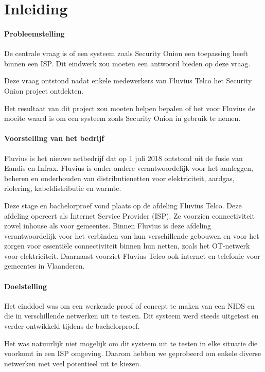 \documentclass[a4paper,12pt]{report}
\begin{document}
\listoffigures

\chapter*{Inleiding}
\subsubsection{Probleemstelling}
De centrale vraag is of een systeem zoals Security Onion een toepassing heeft binnen een ISP.
Dit eindwerk zou moeten een antwoord bieden op deze vraag.

Deze vraag ontstond nadat enkele medewerkers van Fluvius Telco het Security Onion project ontdekten.

Het resultaat van dit project zou moeten helpen bepalen of het voor Fluvius de moeite waard is om een systeem zoals Security Onion in gebruik te nemen.

\subsubsection{Voorstelling van het bedrijf}
Fluvius is het nieuwe netbedrijf dat op 1 juli 2018 ontstond uit de fusie van Eandis en Infrax.
Fluvius is onder andere verantwoordelijk voor het aanleggen, beheren en onderhouden van distributienetten voor elektriciteit, aardgas, riolering, kabeldistributie en warmte.

Deze stage en bachelorproef vond plaats op de afdeling Fluvius Telco.
Deze afdeling opereert als Internet Service Provider (ISP).
Ze voorzien connectiviteit zowel inhouse als voor gemeentes.
Binnen Fluvius is deze afdeling verantwoordelijk voor het verbinden van hun verschillende gebouwen en voor het zorgen voor essentiële connectiviteit binnen hun netten, zoals het OT-netwerk voor elektriciteit.
Daarnaast voorziet Fluvius Telco ook internet en telefonie voor gemeentes in Vlaanderen.

\subsubsection{Doelstelling}
Het einddoel was om een werkende proof of concept te maken van een NIDS en die in verschillende netwerken uit te testen.
Dit systeem werd steeds uitgetest en verder ontwikkeld tijdens de bachelorproef.

Het was natuurlijk niet mogelijk om dit systeem uit te testen in elke situatie die voorkomt in een ISP omgeving.
Daarom hebben we geprobeerd om enkele diverse netwerken met veel potentieel uit te kiezen.
\end{document}

